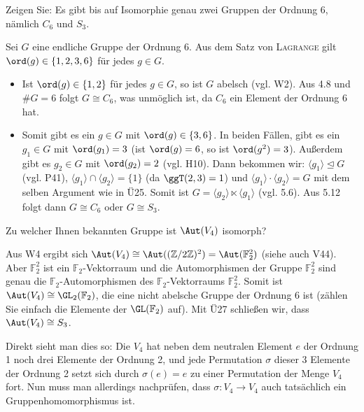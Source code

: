 \begin{uebungsblatt}
\setcounter{taskcount}{26}

\begin{uebung}
	Zeigen Sie: Es gibt bis auf Isomorphie genau zwei Gruppen der Ordnung 6, nämlich $C_6$ und $S_3$.
\end{uebung}
\begin{loesung}
	Sei $G$ eine endliche Gruppe der Ordnung 6. Aus dem Satz von \textsc{Lagrange} gilt $\ord(g)\in\{1,2,3,6\}$ für jedes $g\in G$.
	\begin{itemize}
		\item Ist $\ord(g)\in\{1,2\}$ für jedes $g\in G$, so ist $G$ abelsch (vgl. W2). Aus 4.8 und $\#G=6$ folgt $G\cong C_6$, was unmöglich ist, da $C_6$ ein Element der Ordnung 6 hat.
		\item Somit gibt es ein $g\in G$ mit $\ord(g)\in\{3,6\}$. In beiden Fällen, gibt es ein $g_1\in G$ mit $\ord(g_1)=3$ (ist $\ord(g)=6$, so ist $\ord(g^2)=3$). Außerdem gibt es $g_2\in G$ mit $\ord(g_2)=2$ (vgl. H10). Dann bekommen wir: $\langle g_1\rangle\unlhd G$ (vgl. P41), $\langle g_1\rangle\cap \langle g_2\rangle=\{1\}$ (da $\ggT(2,3)=1$) und $\langle g_1\rangle\cdot\langle g_2\rangle=G$ mit dem selben Argument wie in Ü25. Somit ist $G=\langle g_2\rangle\ltimes\langle g_1\rangle$ (vgl. 5.6). Aus 5.12 folgt dann $G\cong C_6$ oder $G\cong S_3$.
	\end{itemize}
\end{loesung}

\begin{uebung}
	Zu welcher Ihnen bekannten Gruppe ist $\Aut(V_4)$ isomorph?
\end{uebung}
\begin{loesung}
	Aus W4 ergibt sich $\Aut(V_4)\cong \Aut((\mathbb{Z}/2\mathbb{Z})^2)=\Aut(\mathbb{F}_2^2)$ (siehe auch V44). Aber $\mathbb{F}_2^2$ ist ein $\mathbb{F}_2$-Vektorraum und die Automorphismen der Gruppe $\mathbb{F}_2^2$ sind genau die $\mathbb{F}_2$-Automorphismen des $\mathbb{F}_2$-Vektorraums $\mathbb{F}_2^2$. Somit ist $\Aut(V_4)\cong \GL_2(\mathbb{F}_2)$, die eine nicht abelsche Gruppe der Ordnung 6 ist (zählen Sie einfach die Elemente der $\GL(\mathbb{F}_2)$ auf). Mit Ü27 schließen wir, dass $\Aut(V_4)\cong S_3$.
	
	Direkt sieht man dies so: Die $V_4$ hat neben dem neutralen Element $e$ der Ordnung 1 noch drei Elemente der Ordnung 2, und jede Permutation $\sigma$ dieser 3 Elemente der Ordnung 2 setzt sich durch $\sigma(e)=e$ zu einer Permutation der Menge $V_4$ fort. Nun muss man allerdings nachprüfen, dass $\sigma: V_4\to V_4$ auch tatsächlich ein Gruppenhomomorphismus ist.
\end{loesung}


\end{uebungsblatt}
